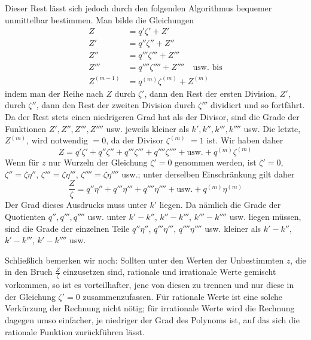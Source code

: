 Dieser Rest lässt sich jedoch durch den folgenden Algorithmus bequemer unmittelbar bestimmen. Man bilde die Gleichungen
\[
\begin{aligned}
Z&=q'\zeta'+Z'\\
Z'&=q''\zeta''+Z''\\
Z''&=q'''\zeta'''+Z'''\\
Z'''&=q''''\zeta''''+Z''''\quad\text{usw. bis}\\
Z^{(m-1)}&=q^{(m)}\zeta^{(m)}+Z^{(m)}
\end{aligned}
\]
indem man der Reihe nach $Z$ durch $\zeta'$, dann den Rest der ersten Division, $Z'$, durch $\zeta''$, dann den Rest der zweiten Division durch $\zeta'''$ dividiert und so fortfährt. Da der Rest stets einen niedrigeren Grad hat als der Divisor, sind die Grade der Funktionen $Z',Z'',Z''',Z''''$ usw. jeweils kleiner als $k',k'',k''',k''''$ usw. Die letzte, $Z^{(m)}$, wird notwendig $=0$, da der Divisor $\zeta^{(m)}$ $=1$ ist. Wir haben daher
\[
Z=q'\zeta'+q''\zeta''+q'''\zeta'''+q''''\zeta''''+\text{usw.}+q^{(m)}\zeta^{(m)}
\]
Wenn für $z$ nur Wurzeln der Gleichung $\zeta'=0$ genommen werden, ist $\zeta'=0$, $\zeta''=\zeta\eta''$, $\zeta'''=\zeta\eta'''$, $\zeta''''=\zeta\eta''''$ usw.; unter derselben Einschränkung gilt daher
\[
\frac{Z}{\zeta}=q''\eta''+q'''\eta'''+q''''\eta''''+\text{usw.}+q^{(m)}\eta^{(m)}
\]
Der Grad dieses Ausdrucks muss unter $k'$ liegen. Da nämlich die Grade der Quotienten $q'',q''',q''''$ usw. unter $k'-k''$, $k''-k'''$, $k'''-k''''$ usw. liegen müssen, sind die Grade der einzelnen Teile $q''\eta''$, $q'''\eta'''$, $q''''\eta''''$ usw. kleiner als $k'-k''$, $k'-k'''$, $k'-k''''$ usw.

Schließlich bemerken wir noch: Sollten unter den Werten der Unbestimmten $z$, die in den Bruch $\frac{Z}{\zeta}$ einzusetzen sind, rationale und irrationale Werte gemischt vorkommen, so ist es vorteilhafter, jene von diesen zu trennen und nur diese in der Gleichung $\zeta'=0$ zusammenzufassen. Für rationale Werte ist eine solche Verkürzung der Rechnung nicht nötig; für irrationale Werte wird die Rechnung dagegen umso einfacher, je niedriger der Grad des Polynoms ist, auf das sich die rationale Funktion zurückführen lässt.

